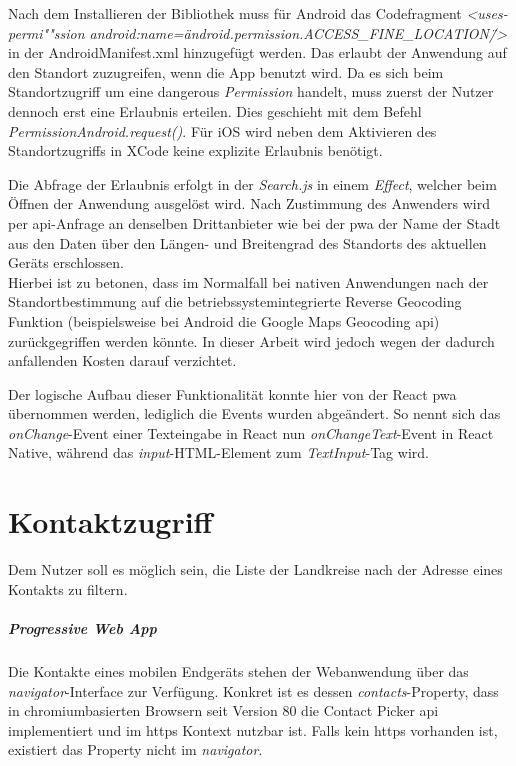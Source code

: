 Nach dem Installieren der Bibliothek muss für Android das Codefragment \textit{<uses-permi""ssion android:name=\"android.permission.ACCESS\_FINE\_LOCATION\"/>} in der AndroidManifest.xml hinzugefügt werden.
Das erlaubt der Anwendung auf den Standort zuzugreifen, wenn die App benutzt wird.
Da es sich beim Standortzugriff um eine \glqq dangerous\grqq{} \textit{Permission} handelt, muss zuerst der Nutzer dennoch erst eine Erlaubnis erteilen. 
Dies geschieht mit dem Befehl \textit{PermissionAndroid.request()}.
Für iOS wird neben dem Aktivieren des Standortzugriffs in XCode keine explizite Erlaubnis benötigt.

Die Abfrage der Erlaubnis erfolgt in der \textit{Search.js} in einem \textit{Effect}, welcher beim Öffnen der Anwendung ausgelöst wird.
Nach Zustimmung des Anwenders wird per \ac{api}-Anfrage an denselben Drittanbieter wie bei der \ac{pwa} der Name der Stadt aus den Daten über den Längen- und Breitengrad des Standorts des aktuellen Geräts erschlossen.\\
Hierbei ist zu betonen, dass im Normalfall bei nativen Anwendungen nach der Standortbestimmung auf die betriebssystemintegrierte Reverse Geocoding Funktion (beispielsweise bei Android die Google Maps Geocoding \ac{api}) zurückgegriffen werden könnte.
In dieser Arbeit wird jedoch wegen der dadurch anfallenden Kosten darauf verzichtet.

Der logische Aufbau dieser Funktionalität konnte hier von der React \ac{pwa} übernommen werden, lediglich die Events wurden abgeändert.
So nennt sich das \textit{onChange}-Event einer Texteingabe in React nun \textit{onChangeText}-Event in React Native, während das \textit{input}-HTML-Element zum \textit{TextInput}-Tag wird.

\section{Kontaktzugriff}
Dem Nutzer soll es möglich sein, die Liste der Landkreise nach der Adresse eines Kontakts zu filtern.

\subparagraph{Progressive Web App\\}
Die Kontakte eines mobilen Endgeräts stehen der Webanwendung über das \textit{navigator}-Interface zur Verfügung.
Konkret ist es dessen \textit{contacts}-Property, dass in chromiumbasierten Browsern seit Version 80 die Contact Picker \ac{api} implementiert und im \ac{https} Kontext nutzbar ist.
Falls kein \ac{https} vorhanden ist, existiert das Property nicht im \textit{navigator}.


